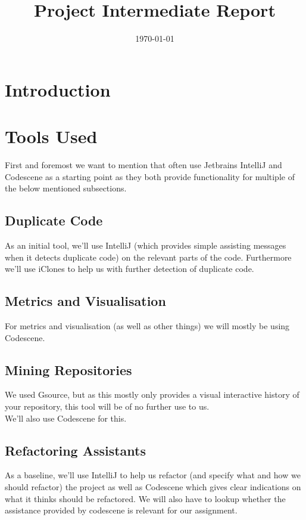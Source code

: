 \documentclass{article}
\title{\textmd{\textbf{Project Intermediate Report}}\\\normalsize\vspace{0.1in}\Large{\projectnaam}}
\author{\student}\date{\today}
\begin{document}
\maketitle
\newpage

\section{Introduction}

\section{Tools Used}

First and foremost we want to mention that often use Jetbrains IntelliJ and Codescene as a starting point as they both provide functionality for multiple of the below mentioned subsections.

\subsection{Duplicate Code}

As an initial tool, we'll use IntelliJ (which provides simple assisting messages when it detects duplicate code) on the relevant parts of the code. Furthermore we'll use iClones to help us with further detection of duplicate code.

\subsection{Metrics and Visualisation}

For metrics and visualisation (as well as other things) we will mostly be using Codescene.

\subsection{Mining Repositories}

We used Gsource, but as this mostly only provides a visual interactive history of your repository, this tool will be of no further use to us.\\

\noindent
We'll also use Codescene for this.

\subsection{Refactoring Assistants}

As a baseline, we'll use IntelliJ to help us refactor (and specify what and how we should refactor) the project as well as Codescene which gives clear indications on what it thinks should be refactored. We will also have to lookup whether the assistance provided by codescene is relevant for our assignment.
\end{document}
